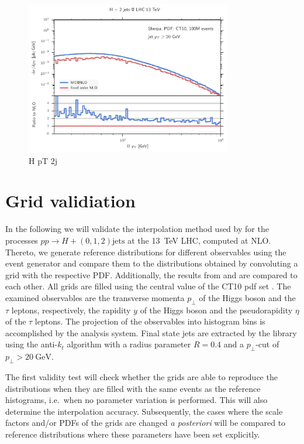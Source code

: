 \begin{figure}
	\centering
	\includegraphics[width=0.8\textwidth]{images/hjj_hpt_nominal.pdf}
	\caption{H pT 2j}
	\label{fig:hjj_hpt_nominal}
\end{figure}
%
\section{Grid validiation}
In the following we will validate the interpolation method used by \mcgrid{} for the processes $pp \rightarrow H + (0,1,2) \text{jets}$ at the \SI{13}{\tera\electronvolt} LHC, computed at NLO.
Thereto, we generate reference distributions for different observables using the \sherpa{} event generator and compare them to the distributions obtained by convoluting a grid with the respective PDF.
Additionally, the results from \appl{} and \fnlo{} are compared to each other.
All grids are filled using the central value of the CT10 pdf set \cite{ct10}.
The examined observables are the transverse momenta $p_\perp$ of the Higgs boson and the $\tau$ leptons, respectively, the rapidity $y$ of the Higgs boson and the pseudorapidity $\eta$ of the $\tau$ leptons.
The projection of the observables into histogram bins is accomplished by the \rivet{} analysis system.
Final state jets are extracted by the \fastjet{} library \cite{fastjet_manual} using the anti-$k_t$ algorithm \cite{anti_kt} with a radius parameter $R=0.4$ and a $p_\perp$-cut of $p_\perp > \SI{20}{\giga\electronvolt}$.

The first validity test will check whether the grids are able to reproduce the distributions when they are filled with the same events as the reference histograms, i.e.\ when no parameter variation is performed.
This will also determine the interpolation accuracy.
Subsequently, the cases where the scale factors and/or PDFs of the grids are changed \textit{a posteriori} will be compared to reference distributions where these parameters have been set explicitly.
%
